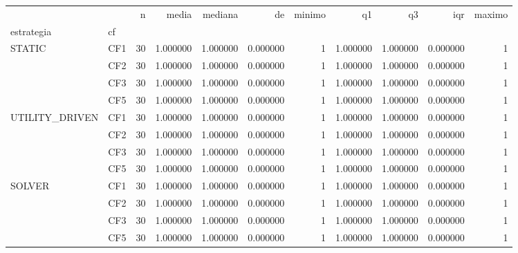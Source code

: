 \begin{tabular}{llrrrrrrrrr}
\toprule
 &  & n & media & mediana & de & minimo & q1 & q3 & iqr & maximo \\
estrategia & cf &  &  &  &  &  &  &  &  &  \\
\midrule
\multirow[t]{4}{*}{STATIC} & CF1 & 30 & 1.000000 & 1.000000 & 0.000000 & 1 & 1.000000 & 1.000000 & 0.000000 & 1 \\
 & CF2 & 30 & 1.000000 & 1.000000 & 0.000000 & 1 & 1.000000 & 1.000000 & 0.000000 & 1 \\
 & CF3 & 30 & 1.000000 & 1.000000 & 0.000000 & 1 & 1.000000 & 1.000000 & 0.000000 & 1 \\
 & CF5 & 30 & 1.000000 & 1.000000 & 0.000000 & 1 & 1.000000 & 1.000000 & 0.000000 & 1 \\
\cline{1-11}
\multirow[t]{4}{*}{UTILITY_DRIVEN} & CF1 & 30 & 1.000000 & 1.000000 & 0.000000 & 1 & 1.000000 & 1.000000 & 0.000000 & 1 \\
 & CF2 & 30 & 1.000000 & 1.000000 & 0.000000 & 1 & 1.000000 & 1.000000 & 0.000000 & 1 \\
 & CF3 & 30 & 1.000000 & 1.000000 & 0.000000 & 1 & 1.000000 & 1.000000 & 0.000000 & 1 \\
 & CF5 & 30 & 1.000000 & 1.000000 & 0.000000 & 1 & 1.000000 & 1.000000 & 0.000000 & 1 \\
\cline{1-11}
\multirow[t]{4}{*}{SOLVER} & CF1 & 30 & 1.000000 & 1.000000 & 0.000000 & 1 & 1.000000 & 1.000000 & 0.000000 & 1 \\
 & CF2 & 30 & 1.000000 & 1.000000 & 0.000000 & 1 & 1.000000 & 1.000000 & 0.000000 & 1 \\
 & CF3 & 30 & 1.000000 & 1.000000 & 0.000000 & 1 & 1.000000 & 1.000000 & 0.000000 & 1 \\
 & CF5 & 30 & 1.000000 & 1.000000 & 0.000000 & 1 & 1.000000 & 1.000000 & 0.000000 & 1 \\
\cline{1-11}
\bottomrule
\end{tabular}
